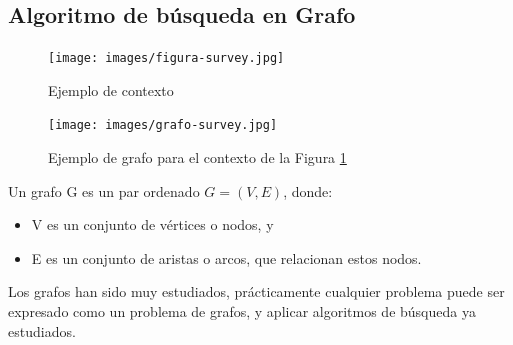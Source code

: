 \subsection{Algoritmo de b\'usqueda en Grafo}
\label{graph}

\begin{figure}[ht]
\centering
\texttt{[image: images/figura-survey.jpg]}
\caption{Ejemplo de contexto}
\label{figura-survey}
\end{figure}

\begin{figure}[ht]
\centering
\texttt{[image: images/grafo-survey.jpg]}
\caption{Ejemplo de grafo para el contexto de la Figura \ref{figura-survey}}
\label{grafo-survey}
\end{figure}


Un grafo G es un par ordenado $G=(V,E)$, donde:
\begin{itemize}
   \item V es un conjunto de v\'ertices o nodos, y
    \item E es un conjunto de aristas o arcos, que relacionan estos nodos.





\end{itemize}

Los grafos han sido muy estudiados, pr\'acticamente cualquier problema puede ser expresado como un problema de grafos, y aplicar algoritmos de b\'usqueda ya estudiados.

